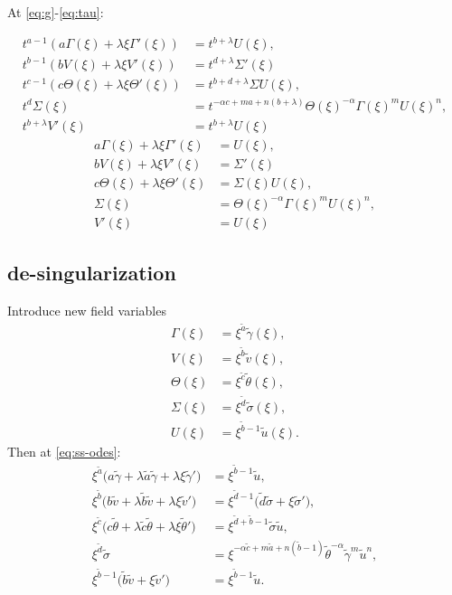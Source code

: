 \documentclass[a4paper,11pt]{article}
\def\tg{{\tilde{\gamma}}}
\def\tv{{\tilde{v}}}
\def\tth{{\tilde{\theta}}}
\def\ts{{\tilde{\sigma}}}
\def\tu{{\tilde{u}}}
\def\ta{{\tilde{a}}}
\def\tb{{\tilde{b}}}
\def\tc{{\tilde{c}}}
\def\td{{\tilde{d}}}
\begin{document}
At \eqref{eq:g}-\eqref{eq:tau}:

\begin{align*}
 t^{a-1}(a \Gamma(\xi) + \lambda \xi \Gamma'(\xi)) &= t^{b+ \lambda} U(\xi),\\
 t^{b-1}(b V(\xi) + \lambda \xi V'(\xi)) &= t^{d+ \lambda} \Sigma'(\xi)\\
 t^{c-1}(c \Theta(\xi) + \lambda \xi \Theta'(\xi))&=t^{b+d+\lambda} \Sigma U(\xi),\\
 t^d\Sigma(\xi) &= t^{-\alpha c +ma +n(b+ \lambda)} \Theta(\xi)^{-\alpha} \Gamma(\xi)^m U(\xi)^n,\\
 t^{b+\lambda}V'(\xi)&=t^{b+\lambda}U(\xi)
\end{align*}
\begin{equation}
\begin{aligned}
 a \Gamma(\xi) + \lambda \xi \Gamma'(\xi) &= U(\xi),\\
 b V(\xi) + \lambda \xi V'(\xi) &= \Sigma'(\xi)\\
 c \Theta(\xi) + \lambda \xi \Theta'(\xi)&=\Sigma(\xi) U(\xi),\\
 \Sigma(\xi) &= \Theta(\xi)^{-\alpha} \Gamma(\xi)^m U(\xi)^n,\\
 V'(\xi)&=U(\xi)
\end{aligned} \label{eq:ss-odes}
\end{equation}
\subsection{de-singularization}
Introduce new field variables
\begin{equation}
\begin{aligned}
 \Gamma(\xi) &= \xi^\ta \tg(\xi),\\
 V(\xi)&=\xi^\tb \tv(\xi),\\
 \Theta(\xi)&=\xi^\tc \tth(\xi),\\
 \Sigma(\xi)&=\xi^\td \ts(\xi),\\
 U(\xi)&=\xi^{\tb-1} \tu(\xi).
\end{aligned}
\end{equation}
Then at \eqref{eq:ss-odes}:
\begin{align*}
 \xi^\ta\Big( a\tg + \lambda \ta \tg + \lambda\xi\tg'\Big) &=\xi^{\tb-1} \tu,\\
 \xi^\tb\Big( b\tv + \lambda \tb \tv + \lambda\xi\tv'\Big) &=\xi^{\td-1} \Big(\td\ts + \xi\ts'\Big),\\
 \xi^\tc\Big( c\tth+ \lambda \tc \tth+ \lambda\xi\tth'\Big)&=\xi^{\td+\tb-1} \ts\tu,\\
 \xi^\td\ts &= \xi^{-\alpha \tc +m\ta +n(\tb-1)} \tth^{-\alpha} \tg^m \tu^n,\\
 \xi^{\tb-1}\Big(\tb\tv + \xi \tv'\Big)&= \xi^{\tb-1} \tu.
\end{align*}
\end{document}
